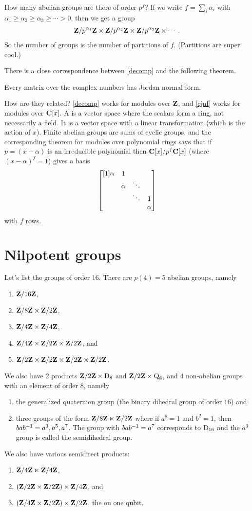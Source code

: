 \documentclass[11pt, oneside]{amsart}
\begin{document}
How many abelian groups are there of order $p^f$? If we write $f = \sum_i \alpha_i $ with $\alpha_1\ge \alpha_2\ge \alpha_3 \ge \cdots > 0$, then we get a group
$$
\mathbf Z / p^{\alpha_1}\mathbf Z \times \mathbf Z / p^{\alpha_2}\mathbf Z \times \mathbf Z / p^{\alpha_3}\mathbf Z  \times \cdots. 
$$
So the number of groups is the number of partitions of $f$. (Partitions are super cool.)

There is a close correspondence between \cref{decomp} and the following theorem.
\begin{theorem}\label{cjnf}
Every matrix over the complex numbers has Jordan normal form. 
\end{theorem}
How are they related? \cref{decomp} works for modules over $\mathbf Z$, and \cref{cjnf} works for modules over $\mathbf C[x]$. A  is a vector space where the scalars form a ring, not necessarily a field. It is a vector space with a linear transformation (which is the action of $x$). Finite abelian groups are sums of cyclic groups, and the corresponding theorem for modules over polynomial rings says that if $p = (x-\alpha)$ is an irreducible polynomial then $\mathbf C[x] / p^f \mathbf C[x] $ (where  $(x-\alpha)^f=1$) gives a basis
$$
\begin{bmatrix} [1] \alpha &1&  & \\ & \alpha& \ddots&   \\ &  & \ddots & 1 \\  &   &  & \alpha\end{bmatrix} 
$$
with $f$ rows. 

\section{Nilpotent groups}
Let's list the groups of order $16$. There are $p(4) = 5$ abelian groups, namely 
\begin{enumerate}
\item $\mathbf Z / 16\mathbf Z$, 
\item $\mathbf Z / 8\mathbf Z \times \mathbf Z / 2\mathbf Z$, 
\item $\mathbf Z / 4\mathbf Z \times \mathbf Z / 4\mathbf Z$, 
\item $\mathbf Z / 4\mathbf Z \times \mathbf Z / 2\mathbf Z \times \mathbf Z / 2\mathbf Z$, and 
\item $\mathbf Z / 2\mathbf Z \times \mathbf Z / 2\mathbf Z \times \mathbf Z / 2\mathbf Z \times \mathbf Z / 2\mathbf Z$.
\end{enumerate}
We also have $2$ products $\mathbf Z/2\mathbf Z \times \operatorname{D}_8$ and $\mathbf Z/2\mathbf Z \times \operatorname{Q}_8$, and $4$ non-abelian groups with an element of order $8$, namely
\begin{enumerate}
\item the generalized quaternion group (the binary dihedral group of order $16$) and
\item three groups of the form $\mathbf Z / 8\mathbf Z \ltimes \mathbf Z / 2\mathbf Z$ where if $a^8 = 1$ and $b^2=1$, then $bab^{-1} = a^3,a^5,a^7$. The group with $bab^{-1} = a^7$ corresponds to $\operatorname{D}_{16}$ and the $a^3$ group is called the semidihedral group.
\end{enumerate}
We also have various semidirect products:
\begin{enumerate}
\item $\mathbf Z / 4\mathbf Z\ltimes \mathbf Z / 4\mathbf Z$,
\item $(\mathbf Z / 2\mathbf Z\times \mathbf Z / 2\mathbf Z) \ltimes \mathbf Z / 4\mathbf Z$, and
\item $(\mathbf Z / 4\mathbf Z \times \mathbf Z / 2\mathbf Z) \ltimes \mathbf Z / 2\mathbf Z$, the  on one qubit.
\end{enumerate}
\end{document}
